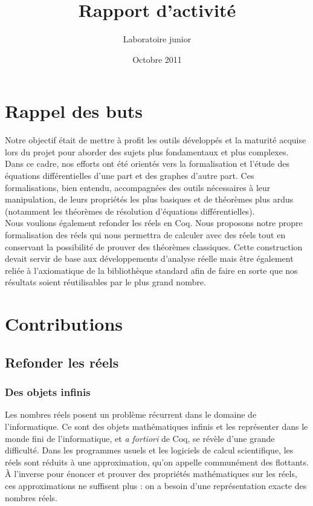 \documentclass[11pt]{article}
\title{Rapport d'activité}
\author{Laboratoire junior \coqtail{}}
\date{Octobre 2011}
\begin{document}
\maketitle

\section{Rappel des buts}

Notre objectif était de mettre à profit les outils développés et la maturité acquise
lors du projet \coquille{} pour aborder des sujets plus fondamentaux et plus
complexes. Dans ce cadre, nos efforts ont été orientés vers la formalisation et
l'étude des équations différentielles d'une part et des graphes d'autre part. Ces
formalisations, bien entendu, accompagnées des outils nécessaires à leur manipulation,
de leurs propriétés les plus basiques et de théorèmes plus ardus (notamment les
théorèmes de résolution d'équations différentielles).\\

Nous voulions également refonder les réels en Coq. Nous proposons notre propre
formalisation des réels qui nous permettra de calculer avec des réels tout en
conservant la possibilité de prouver des théorèmes classiques. Cette construction
devait servir de base aux développements d'analyse réelle mais être également
reliée à l'axiomatique de la bibliothèque standard afin de faire en sorte que nos
résultats soient réutilisables par le plus grand nombre.

\section{Contributions}

\subsection{Refonder les réels}

\subsubsection{Des objets infinis}

Les nombres réels posent un problème récurrent dans le domaine de l'informatique.
Ce sont des objets mathématiques infinis et les représenter dans le monde fini de
l'informatique, et \emph{a fortiori} de Coq, se révèle d'une grande difficulté.
Dans les programmes usuels et les logiciels de calcul scientifique, les réels sont
réduits à une approximation, qu'on appelle communément des flottants. À l'inverse
pour énoncer et prouver des propriétés mathématiques sur les réels, ces
approximations ne suffisent plus : on a besoin d'une représentation exacte des
nombres réels.
\end{document}
